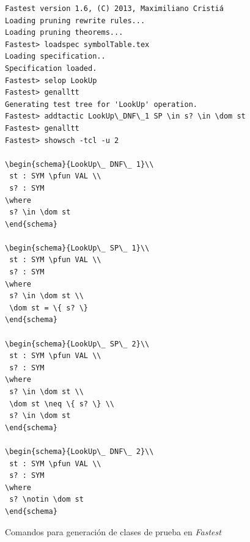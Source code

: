 \begin{figure}[H]
\begin{Verbatim}[frame=single,fontsize=\scriptsize]
Fastest version 1.6, (C) 2013, Maximiliano Cristiá
Loading pruning rewrite rules...
Loading pruning theorems...
Fastest> loadspec symbolTable.tex
Loading specification..
Specification loaded.
Fastest> selop LookUp
Fastest> genalltt 
Generating test tree for 'LookUp' operation.
Fastest> addtactic LookUp\_DNF\_1 SP \in s? \in \dom st
Fastest> genalltt                                    
Fastest> showsch -tcl -u 2

\begin{schema}{LookUp\_ DNF\_ 1}\\
 st : SYM \pfun VAL \\
 s? : SYM 
\where
 s? \in \dom st
\end{schema}

\begin{schema}{LookUp\_ SP\_ 1}\\
 st : SYM \pfun VAL \\
 s? : SYM 
\where
 s? \in \dom st \\
 \dom st = \{ s? \}
\end{schema}

\begin{schema}{LookUp\_ SP\_ 2}\\
 st : SYM \pfun VAL \\
 s? : SYM 
\where
 s? \in \dom st \\
 \dom st \neq \{ s? \} \\
 s? \in \dom st
\end{schema}

\begin{schema}{LookUp\_ DNF\_ 2}\\
 st : SYM \pfun VAL \\
 s? : SYM 
\where
 s? \notin \dom st
\end{schema}
\end{Verbatim}
\caption{Comandos para generación de clases de prueba en \emph{Fastest}}
\label{ej:comandos_fastest}
\end{figure}

